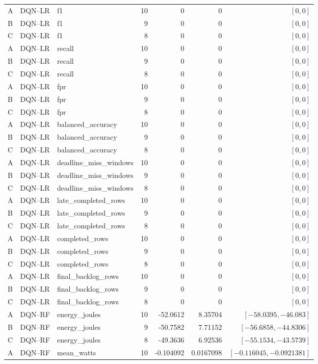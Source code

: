\begin{longtable}{lllrrrr}
A & DQN--LR & f1 & 10 & 0 & 0 & $[0,0]$\\
B & DQN--LR & f1 & 9 & 0 & 0 & $[0,0]$\\
C & DQN--LR & f1 & 8 & 0 & 0 & $[0,0]$\\
A & DQN--LR & recall & 10 & 0 & 0 & $[0,0]$\\
B & DQN--LR & recall & 9 & 0 & 0 & $[0,0]$\\
C & DQN--LR & recall & 8 & 0 & 0 & $[0,0]$\\
A & DQN--LR & fpr & 10 & 0 & 0 & $[0,0]$\\
B & DQN--LR & fpr & 9 & 0 & 0 & $[0,0]$\\
C & DQN--LR & fpr & 8 & 0 & 0 & $[0,0]$\\
A & DQN--LR & balanced\_accuracy & 10 & 0 & 0 & $[0,0]$\\
B & DQN--LR & balanced\_accuracy & 9 & 0 & 0 & $[0,0]$\\
C & DQN--LR & balanced\_accuracy & 8 & 0 & 0 & $[0,0]$\\
A & DQN--LR & deadline\_miss\_windows & 10 & 0 & 0 & $[0,0]$\\
B & DQN--LR & deadline\_miss\_windows & 9 & 0 & 0 & $[0,0]$\\
C & DQN--LR & deadline\_miss\_windows & 8 & 0 & 0 & $[0,0]$\\
A & DQN--LR & late\_completed\_rows & 10 & 0 & 0 & $[0,0]$\\
B & DQN--LR & late\_completed\_rows & 9 & 0 & 0 & $[0,0]$\\
C & DQN--LR & late\_completed\_rows & 8 & 0 & 0 & $[0,0]$\\
A & DQN--LR & completed\_rows & 10 & 0 & 0 & $[0,0]$\\
B & DQN--LR & completed\_rows & 9 & 0 & 0 & $[0,0]$\\
C & DQN--LR & completed\_rows & 8 & 0 & 0 & $[0,0]$\\
A & DQN--LR & final\_backlog\_rows & 10 & 0 & 0 & $[0,0]$\\
B & DQN--LR & final\_backlog\_rows & 9 & 0 & 0 & $[0,0]$\\
C & DQN--LR & final\_backlog\_rows & 8 & 0 & 0 & $[0,0]$\\
A & DQN--RF & energy\_joules & 10 & -52.0612 & 8.35704 & $[-58.0395,-46.083]$\\
B & DQN--RF & energy\_joules & 9 & -50.7582 & 7.71152 & $[-56.6858,-44.8306]$\\
C & DQN--RF & energy\_joules & 8 & -49.3636 & 6.92536 & $[-55.1534,-43.5739]$\\
A & DQN--RF & mean\_watts & 10 & -0.104092 & 0.0167098 & $[-0.116045,-0.0921381]$\\

\end{longtable}
